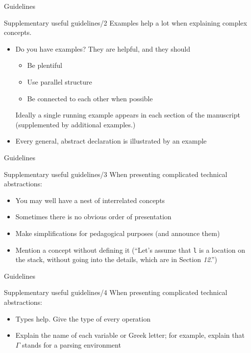 \documentclass{beamer}
\begin{document}
\begin{frame}{Guidelines}
\begin{block}{Supplementary useful guidelines/2}
Examples help a lot when explaining complex concepts.
\begin{itemize}
\item Do you have examples? They are helpful, and they should
\begin{itemize}
\item Be plentiful 
\item Use parallel structure 
\item Be connected to each other when possible
\end{itemize}
Ideally a single running example appears in each section of the manuscript (supplemented by additional examples.)
\item Every general, abstract declaration is illustrated by an example
\end{itemize}
\end{block}
\end{frame}


\begin{frame}{Guidelines}
\begin{block}{Supplementary useful guidelines/3}
When presenting complicated technical abstractions:
\begin{itemize}
\item You may well have a nest of interrelated concepts 
\item Sometimes there is no obvious order of presentation
\item Make simplifications for pedagogical purposes (and announce them)
\item Mention a concept without defining it (``Let’s assume that \texttt{l} is a location on the stack, without going into the details, which are in Section \textit{12}.'')
\end{itemize}
\end{block}
\end{frame}


\begin{frame}{Guidelines}
\begin{block}{Supplementary useful guidelines/4}
When presenting complicated technical abstractions:
\begin{itemize}
\item Types help. Give the type of every operation
\item Explain the name of each variable or Greek letter; for example, explain that $\Gamma$ stands for a parsing environment
\end{itemize}
\end{block}
\end{frame}
\end{document}
